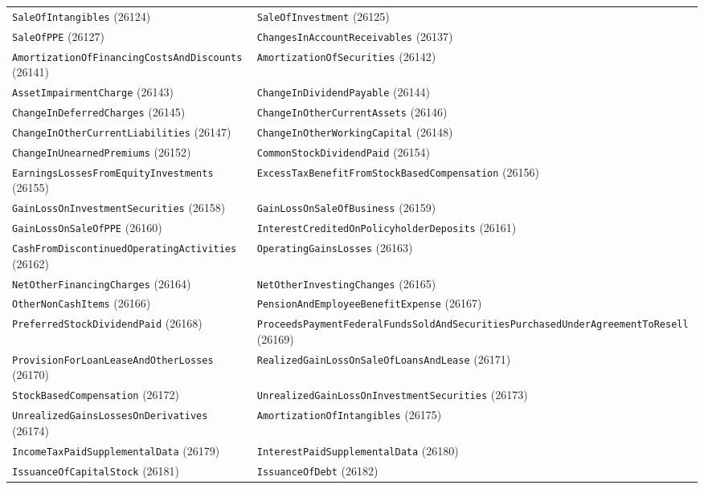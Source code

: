\documentclass[11pt,a4paper]{report}
\begin{document}
\begin{subappendices}
{\begin{longtable}{@{}p{}p{}@{}}
\texttt{SaleOfIntangibles} (26124) & \texttt{SaleOfInvestment} (26125) \\
\texttt{SaleOfPPE} (26127) & \texttt{ChangesInAccountReceivables} (26137) \\
\texttt{AmortizationOfFinancingCostsAndDiscounts} (26141) & \texttt{AmortizationOfSecurities} (26142) \\
\texttt{AssetImpairmentCharge} (26143) & \texttt{ChangeInDividendPayable} (26144) \\
\texttt{ChangeInDeferredCharges} (26145) & \texttt{ChangeInOtherCurrentAssets} (26146) \\
\texttt{ChangeInOtherCurrentLiabilities} (26147) & \texttt{ChangeInOtherWorkingCapital} (26148) \\
\texttt{ChangeInUnearnedPremiums} (26152) & \texttt{CommonStockDividendPaid} (26154) \\
\texttt{EarningsLossesFromEquityInvestments} (26155) & \texttt{ExcessTaxBenefitFromStockBasedCompensation} (26156) \\
\texttt{GainLossOnInvestmentSecurities} (26158) & \texttt{GainLossOnSaleOfBusiness} (26159) \\
\texttt{GainLossOnSaleOfPPE} (26160) & \texttt{InterestCreditedOnPolicyholderDeposits} (26161) \\
\texttt{CashFromDiscontinuedOperatingActivities} (26162) & \texttt{OperatingGainsLosses} (26163) \\
\texttt{NetOtherFinancingCharges} (26164) & \texttt{NetOtherInvestingChanges} (26165) \\
\texttt{OtherNonCashItems} (26166) & \texttt{PensionAndEmployeeBenefitExpense} (26167) \\
\texttt{PreferredStockDividendPaid} (26168) & \texttt{ProceedsPaymentFederalFundsSoldAndSecuritiesPurchasedUnderAgreementToResell} (26169) \\
\texttt{ProvisionForLoanLeaseAndOtherLosses} (26170) & \texttt{RealizedGainLossOnSaleOfLoansAndLease} (26171) \\
\texttt{StockBasedCompensation} (26172) & \texttt{UnrealizedGainLossOnInvestmentSecurities} (26173) \\
\texttt{UnrealizedGainsLossesOnDerivatives} (26174) & \texttt{AmortizationOfIntangibles} (26175) \\
\texttt{IncomeTaxPaidSupplementalData} (26179) & \texttt{InterestPaidSupplementalData} (26180) \\
\texttt{IssuanceOfCapitalStock} (26181) & \texttt{IssuanceOfDebt} (26182) \\

\end{longtable}}
\end{subappendices}
\end{document}
